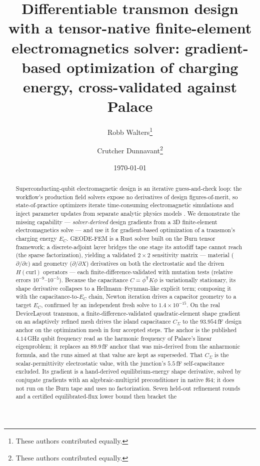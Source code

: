 \documentclass{anvil-paper}
\title{Differentiable transmon design with a tensor-native finite-element
electromagnetics solver: gradient-based optimization of charging energy,
cross-validated against Palace}
\author{Robb Walters\thanks{These authors contributed equally.}
  \and Crutcher Dunnavant\thanks{These authors contributed equally.}}
\date{\today}
\begin{document}
\maketitle

\begin{abstract}
Superconducting-qubit electromagnetic design is an iterative
guess-and-check loop: the workflow's production field solvers expose no
derivatives of design figures-of-merit, so state-of-practice optimizers
iterate time-consuming electromagnetic simulations and inject parameter
updates from separate analytic physics models
\citep{eriksson2025automated}. We demonstrate the missing capability ---
\emph{solver-derived} design gradients from a 3D finite-element
electromagnetics solve --- and use it for gradient-based optimization of a
transmon's charging energy $E_C$. GEODE-FEM is a Rust solver built on the
Burn tensor framework; a discrete-adjoint layer bridges the one stage its
autodiff tape cannot reach (the sparse factorization), yielding a
validated $2\times 2$ sensitivity matrix --- material ($\partial/\partial
\varepsilon$) and geometry ($\partial/\partial X$) derivatives on both the
electrostatic and the driven $H(\mathrm{curl})$ operators --- each
finite-difference-validated with mutation tests (relative errors
$10^{-9}$--$10^{-5}$). Because the capacitance $C = \phi^{\mathsf{T}}
K\phi$ is variationally stationary, its shape derivative collapses to a
Hellmann--Feynman-like explicit term; composing it with the
capacitance-to-$E_C$ chain, Newton iteration drives a capacitor geometry
to a target $E_C$, confirmed by an independent fresh solve to
$1.4\times 10^{-15}$. On the real DeviceLayout transmon, a
finite-difference-validated quadratic-element shape gradient on an
adaptively refined mesh drives the island capacitance $C_\Sigma$ to the
$93.954$\,fF design anchor on the optimization mesh in four accepted
steps. The anchor is the
published $4.14$\,GHz qubit frequency read as the harmonic frequency of
Palace's linear eigenproblem; it replaces an $89.9$\,fF anchor that was
mis-derived from the anharmonic formula, and the runs aimed at that value
are kept as superseded. That $C_\Sigma$ is the
scalar-permittivity electrostatic value, with the junction's $5.5$\,fF
self-capacitance excluded. Its gradient is a hand-derived
equilibrium-energy shape derivative, solved by conjugate gradients with
an algebraic-multigrid preconditioner in native f64; it does not run on
the Burn tape and uses no factorization. Seven held-out refinement
rounds and a certified equilibrated-flux lower bound then bracket the

\end{abstract}
\end{document}
